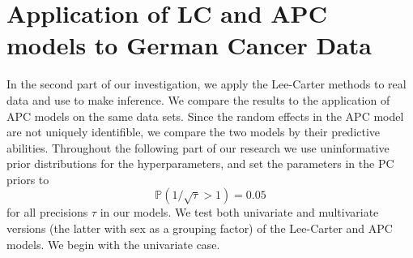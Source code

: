 \newpage
\section{Application of LC and APC models to German Cancer Data}
\label{sec:real-data}
In the second part of our investigation, we apply the Lee-Carter methods to real data and use \inlabru to make inference. We compare the results to the application of APC models on the same data sets. Since the random effects in the APC model are not uniquely identifible, we compare the two models by their predictive abilities. Throughout the following part of our research we use uninformative prior distributions for the hyperparameters, and set the parameters in the PC priors to
\begin{equation*}
    \mathbb{P}(1/\sqrt{\tau} > 1) = 0.05
\end{equation*}
for all precisions $\tau$ in our models. We test both univariate and multivariate versions (the latter with sex as a grouping factor) of the Lee-Carter and APC models. We begin with the univariate case. 

